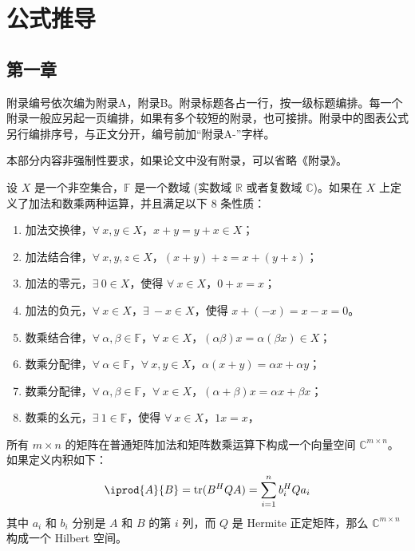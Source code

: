 \chapter{公式推导}

\section{第一章}

附录编号依次编为附录A，附录B。附录标题各占一行，按一级标题编排。每一个附录一般应另起一页编排，如果有多个较短的附录，也可接排。附录中的图表公式另行编排序号，与正文分开，编号前加“附录A-”字样。

{\color{red} 本部分内容非强制性要求，如果论文中没有附录，可以省略《附录》。}


\begin{definition}[向量空间]
	设 $X$ 是一个非空集合，$\mathbb{F}$ 是一个数域 (实数域 $\mathbb{R}$ 或者复数域 $\mathbb{C}$)。如果在 $X$ 上定义了加法和数乘两种运算，并且满足以下 8 条性质：
	\begin{enumerate}
		\item 加法交换律，$\forall~x,y \in X$，$x+y = y+x \in X$；
		\item 加法结合律，$\forall~x,y,z \in X$，$(x+y)+z = x+(y+z)$；
		\item 加法的零元，$\exists~0 \in X$，使得 $\forall~x \in X$，$0+x = x$；
		\item 加法的负元，$\forall~x \in X$，$\exists~-x \in X$，使得 $x+(-x) = x-x = 0$。
		\item 数乘结合律，$\forall~\alpha,\beta \in \mathbb{F}$，$\forall~x \in X$，$(\alpha\beta)x = \alpha(\beta x) \in X$；
		\item 数乘分配律，$\forall~\alpha \in \mathbb{F}$，$\forall~x,y \in X$，$\alpha(x+y) = \alpha x + \alpha y$；
		\item 数乘分配律，$\forall~\alpha,\beta \in \mathbb{F}$，$\forall~x \in X$，$(\alpha+\beta)x = \alpha x + \beta x$；
		\item 数乘的幺元，$\exists~1 \in \mathbb{F}$，使得 $\forall~x \in X$，$1 x = x$，
	\end{enumerate}
\end{definition}

\begin{example}[矩阵空间]
	所有 $m\times n$ 的矩阵在普通矩阵加法和矩阵数乘运算下构成一个向量空间 $\mathbb{C}^{m\times n}$。如果定义内积如下：
	\begin{equation}
	\iprod{A}{B} = \mathrm{tr}(B^H Q A) = \sum_{i=1}^{n} b_i^H Q a_i
	\end{equation}
	其中 $a_i$ 和 $b_i$ 分别是 $A$ 和 $B$ 的第 $i$ 列，而 $Q$ 是 Hermite 正定矩阵，那么 $\mathbb{C}^{m\times n}$ 构成一个 Hilbert 空间。
\end{example}

